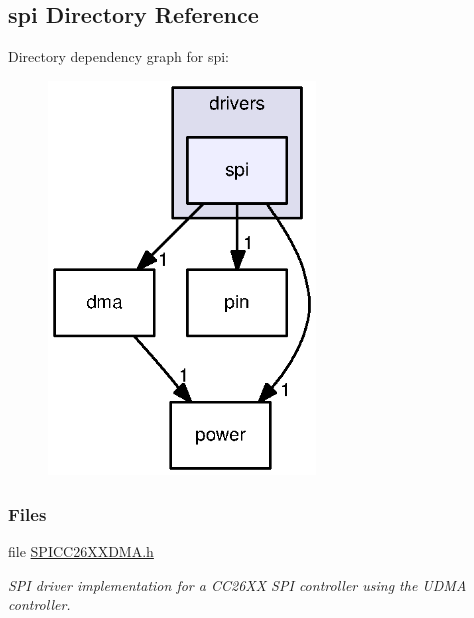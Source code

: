 \subsection{spi Directory Reference}
\label{dir_ebd74b72cf277399a7fe928b5be88439}
Directory dependency graph for spi\+:
\nopagebreak
\begin{figure}[H]
\begin{center}
\leavevmode
\includegraphics[width=201pt]{dir_ebd74b72cf277399a7fe928b5be88439_dep}
\end{center}
\end{figure}
\subsubsection*{Files}
\begin{DoxyCompactItemize}
\item 
file \hyperlink{_s_p_i_c_c26_x_x_d_m_a_8h}{S\+P\+I\+C\+C26\+X\+X\+D\+M\+A.\+h}
\begin{DoxyCompactList}\small\item\em S\+P\+I driver implementation for a C\+C26\+X\+X S\+P\+I controller using the U\+D\+M\+A controller. \end{DoxyCompactList}\end{DoxyCompactItemize}
